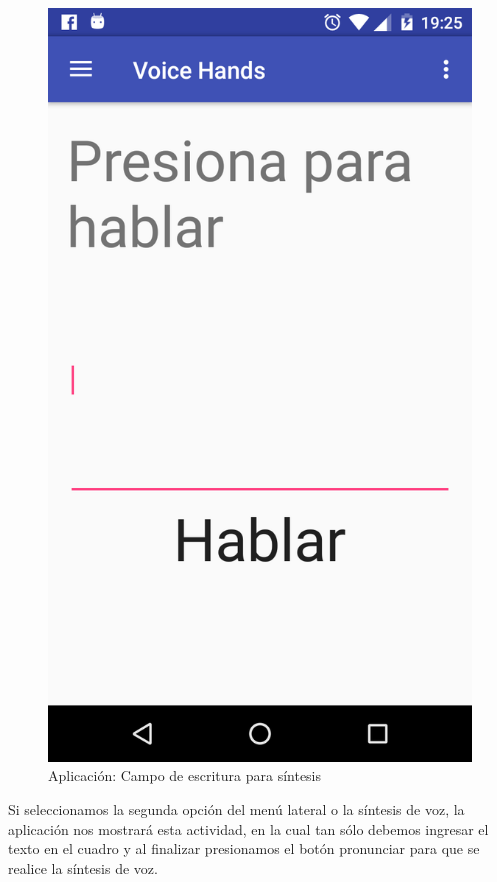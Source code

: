 \begin{figure}[H]
	\centering
	\includegraphics[scale = 0.2]{figures/app06}
	\caption{Aplicación: Campo de escritura para síntesis}
	\label{fig:app06}
\end{figure}

Si seleccionamos la segunda opción del menú lateral o la síntesis de voz, la aplicación nos mostrará esta actividad, en la cual tan sólo debemos ingresar el texto en el cuadro y al finalizar presionamos el botón pronunciar para que se realice la síntesis de voz.

